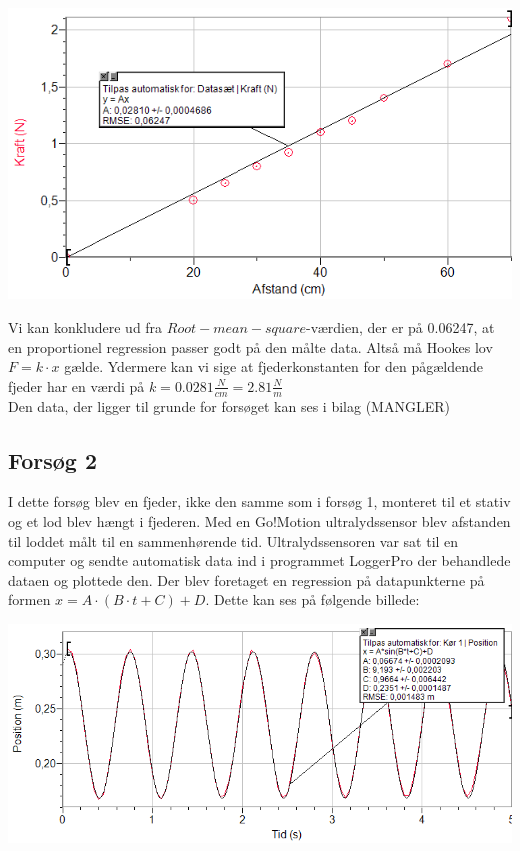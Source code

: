 \begin{center}
\includegraphics[scale=0.7]{Billeder/graf1}
\end{center}
Vi kan konkludere ud fra $Root-mean-square$-værdien, der er på 0.06247, at en proportionel regression passer godt på den målte data. Altså må Hookes lov $F=k \cdot x$ gælde. Ydermere kan vi sige at fjederkonstanten for den pågældende fjeder har en værdi på $k=0.0281\frac{N}{cm} = 2.81 \frac{N}{m}$
\\

Den data, der ligger til grunde for forsøget kan ses i bilag (MANGLER) 
\\

\subsection{Forsøg 2}
I dette forsøg blev en fjeder, ikke den samme som i forsøg 1, monteret til et stativ og et lod blev hængt i fjederen. Med en Go!Motion ultralydssensor blev afstanden til loddet målt til en sammenhørende tid. Ultralydssensoren var sat til en computer og sendte automatisk data ind i programmet LoggerPro der behandlede dataen og plottede den. Der blev foretaget en regression på datapunkterne på formen $x = A \cdot (B \cdot t + C) + D$. Dette kan ses på følgende billede: 
\begin{center}
\includegraphics[scale=0.7]{Billeder/graf2}
\end{center}

